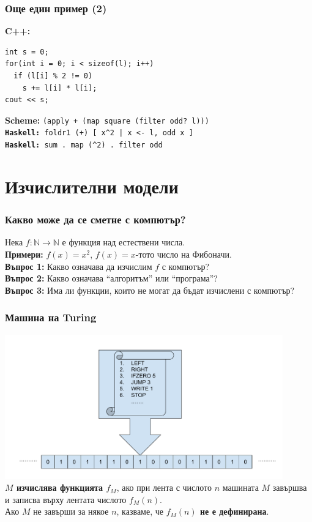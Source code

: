 \documentclass[alsotrans]{beamerswitch}
\begin{document}
\begin{frame}[fragile]
  \frametitle{Още един пример (2)}
  \textbf{C++:}
\begin{verbatim}
int s = 0;
for(int i = 0; i < sizeof(l); i++)
  if (l[i] % 2 != 0)
    s += l[i] * l[i];
cout << s;
\end{verbatim}
  \pause
  \textbf{Scheme:} \tt{(apply + (map square (filter odd? l)))}\\[1em]
  \pause
  \textbf{Haskell:} \tt{foldr1 (+) [ x\^{}2 | x <- l, odd x ]}\\[1em]
  \pause
  \textbf{Haskell:} \tt{sum . map (\^{}2) . filter odd}
\end{frame}

\section*{Изчислителни модели}

\begin{frame}
  \frametitle{Какво може да се сметне с компютър?}

  Нека $f:\mathbb N\to\mathbb N$ е функция над естествени числа.\\[1em]

  \textbf{Примери:} $f(x) = x^2$, $f(x) = x$-тото число на Фибоначи.\\[2em]
  \pause
  \textbf{Въпрос 1:} Какво означава да изчислим $f$ с компютър?\\[2em]
  \pause
  \textbf{Въпрос 2:} Какво означава ``алгоритъм'' или ``програма''?\\[2em]
  \pause
  \textbf{Въпрос 3:} Има ли функции, които не могат да бъдат изчислени с компютър?
\end{frame}

\begin{frame}
  \frametitle{Машина на Turing}

  \includegraphics[width=0.9\textwidth]{images/turing.pdf}\\
  \pause
  \textbf{$M$ изчислява функцията $f_M$}, ако при лента с числото $n$ машината $M$ завършва и записва върху лентата числото $f_M(n)$.\\
  \pause
  Ако $M$ не завърши за някое $n$, казваме, че \textbf{$f_M(n)$ не е дефинирана}.
\end{frame}
\end{document}
